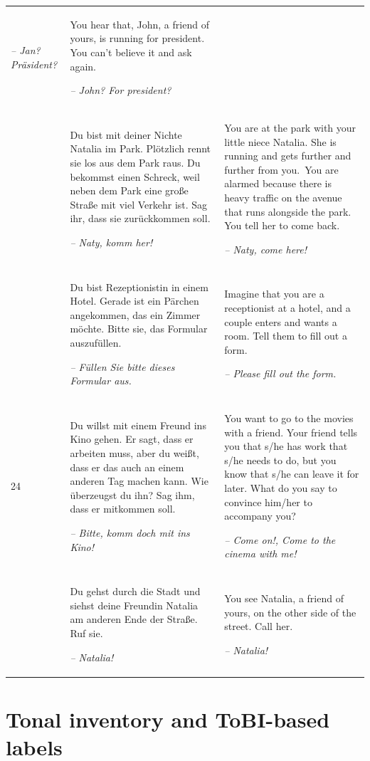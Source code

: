 \begin{xltabular}{\textwidth}{lQQ}
\textit{-- Jan? Präsident?} & You hear that, John, a friend of yours, is running for president. You can’t believe it and ask again.

{\itshape -- John? For president?}\\
 & Du bist mit deiner Nichte Natalia im Park. Plötzlich rennt sie los aus dem Park raus. Du bekommst einen Schreck, weil neben dem Park eine große Straße mit viel Verkehr ist. Sag ihr, dass sie zurückkommen soll.

\textit{-- Naty, komm her!} & You are at the park with your little niece Natalia. She is running and gets further and further from you.~You are alarmed because there is heavy traffic on the avenue that runs alongside the park. You tell her to come back.

{\itshape -- Naty, come here!}\\
 & Du bist Rezeptionistin in einem Hotel. Gerade ist ein Pärchen angekommen, das ein Zimmer möchte. Bitte sie, das Formular auszufüllen.

\textit{-- Füllen Sie bitte dieses Formular aus.} & Imagine that you are a receptionist at a hotel, and a couple enters and wants a room. Tell them to fill out a form.

{\itshape -- Please fill out the form.}\\
24 & Du willst mit einem Freund ins Kino gehen. Er sagt, dass er arbeiten muss, aber du weißt, dass er das auch an einem anderen Tag machen kann. Wie überzeugst du ihn? Sag ihm, dass er mitkommen soll.

\textit{-- Bitte, komm doch mit ins Kino!} & You want to go to the movies with a friend. Your friend tells you that s/he has work that s/he needs to do, but you know that s/he can leave it for later. What do you say to convince him/her to accompany you?

{\itshape -- Come on!, Come to the cinema with me!}\\
 & Du gehst durch die Stadt und siehst deine Freundin Natalia am anderen Ende der Straße. Ruf sie.

\textit{-- Natalia!} & You see Natalia, a friend of yours, on the other side of the street. Call her.

\textit{-- Natalia!}\\
\end{xltabular}


\chapter{Tonal inventory and ToBI-based labels}\label{app:b}

